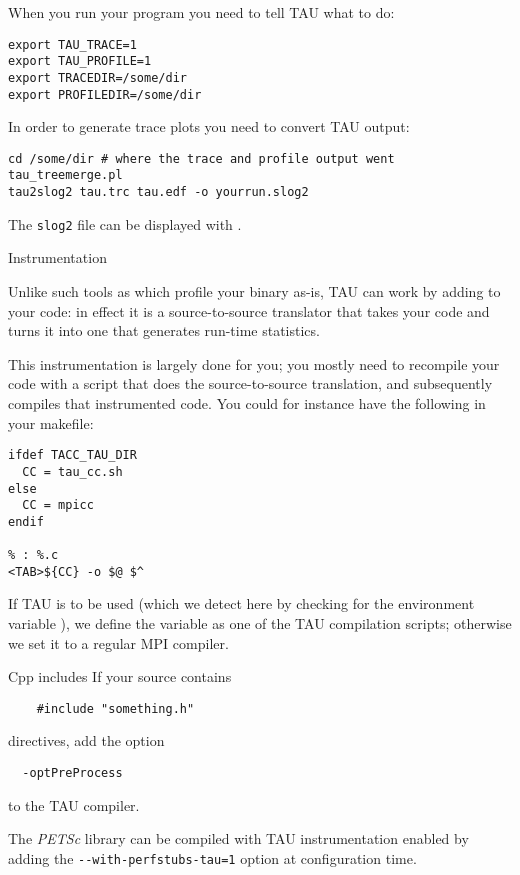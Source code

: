 When you run your program you need to tell TAU what to do:
\begin{verbatim}
export TAU_TRACE=1
export TAU_PROFILE=1
export TRACEDIR=/some/dir
export PROFILEDIR=/some/dir
\end{verbatim}

In order to generate trace plots you need to convert TAU output:
\begin{verbatim}
cd /some/dir # where the trace and profile output went
tau_treemerge.pl
tau2slog2 tau.trc tau.edf -o yourrun.slog2
\end{verbatim}

The \texttt{slog2} file can be displayed with .


 {Instrumentation}

Unlike such tools as  which profile your binary as-is,
TAU can work by adding  to your code: in
effect it is a source-to-source translator that takes your code and
turns it into one that generates run-time statistics.

This instrumentation is largely done for you; you mostly need to recompile
your code with a script that does the source-to-source translation,
and subsequently compiles that instrumented code.
You could for instance have the following in your makefile:
\begin{verbatim}
ifdef TACC_TAU_DIR
  CC = tau_cc.sh
else
  CC = mpicc
endif

% : %.c
<TAB>${CC} -o $@ $^
\end{verbatim}
If TAU is to be used (which we detect here by checking for the environment variable
), we define the  variable as
one of the TAU compilation scripts; otherwise we set it to a regular MPI compiler.

\begin{fortrannote}{Cpp includes}
  If your source contains 
  \begin{lstlisting}
    #include "something.h" 
  \end{lstlisting}
  directives, add the option
\begin{verbatim}
  -optPreProcess
\end{verbatim}
to the TAU compiler.
\end{fortrannote}

\begin{remark}
  The \emph{PETSc}
  library can be compiled with TAU instrumentation enabled
  by adding the \lstinline{--with-perfstubs-tau=1} option
  at configuration time.
\end{remark}

